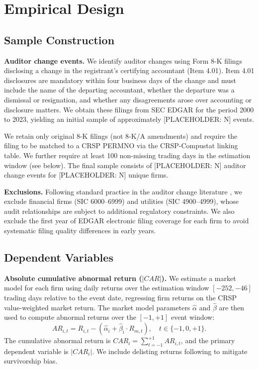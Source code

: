 
\section{Empirical Design}
\label{sec:design}

\subsection{Sample Construction}

\textbf{Auditor change events.} We identify auditor changes using Form 8-K
filings disclosing a change in the registrant's certifying accountant (Item
4.01). Item 4.01 disclosures are mandatory within four business days of the
change and must include the name of the departing accountant, whether the
departure was a dismissal or resignation, and whether any disagreements arose
over accounting or disclosure matters. We obtain these filings from SEC EDGAR
for the period 2000 to 2023, yielding an initial sample of approximately
[PLACEHOLDER: N] events.

We retain only original 8-K filings (not 8-K/A amendments) and require the
filing to be matched to a CRSP PERMNO via the CRSP-Compustat linking table.
We further require at least 100 non-missing trading days in the estimation
window (see below). The final sample consists of [PLACEHOLDER: N] auditor
change events for [PLACEHOLDER: N] unique firms.

\textbf{Exclusions.} Following standard practice in the auditor change
literature \citep{defond2014}, we exclude financial firms (SIC 6000--6999)
and utilities (SIC 4900--4999), whose audit relationships are subject to
additional regulatory constraints. We also exclude the first year of EDGAR
electronic filing coverage for each firm to avoid systematic filing quality
differences in early years.

\subsection{Dependent Variables}

\textbf{Absolute cumulative abnormal return ($|CAR|$).} We estimate a
market model for each firm using daily returns over the estimation window
$[-252, -46]$ trading days relative to the event date, regressing firm
returns on the CRSP value-weighted market return. The market model
parameters $\hat{\alpha}$ and $\hat{\beta}$ are then used to compute
abnormal returns over the $[-1, +1]$ event window:
\begin{equation}
    AR_{i,t} = R_{i,t} - (\hat{\alpha}_i + \hat{\beta}_i \cdot R_{m,t}),
    \quad t \in \{-1, 0, +1\}.
\end{equation}
The cumulative abnormal return is $CAR_i = \sum_{t=-1}^{+1} AR_{i,t}$, and
the primary dependent variable is $|CAR_i|$. We include delisting returns
following \citet{beaver2007} to mitigate survivorship bias.

